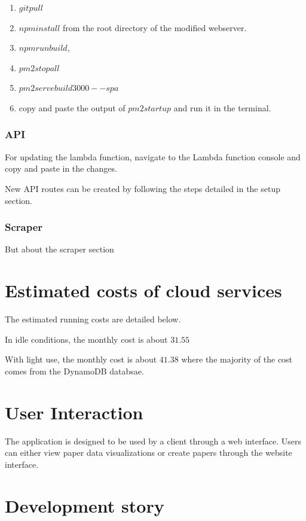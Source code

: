 \documentclass[12pt]{article}
\begin{document}
\begin{enumerate}
    \item $git pull$
    \item $npm install$ from the root directory of the modified webserver.
    \item $npm run build$,
    \item $pm2 stop all$
    \item $pm2 serve build 3000 --spa$ 
    \item copy and paste the output of $pm2 startup$ and run it in the terminal.
\end{enumerate}

\subsubsection{API}

For updating the lambda function, navigate to the Lambda function console and copy and paste in the changes.

New API routes can be created by following the steps detailed in the setup section.

\subsubsection{Scraper}

But about the scraper section 

\section{Estimated costs of cloud services}
The estimated running costs are detailed below.

In idle conditions, the monthly cost is about $31.55$

With light use, the monthly cost is about $41.38$ where the majority of the cost comes from the DynamoDB databsae.

\section{User Interaction}

The application is designed to be used by a client through a web interface. Users can either view paper data visualizations or create papers through the website interface. 


\section{Development story}
\end{document}
